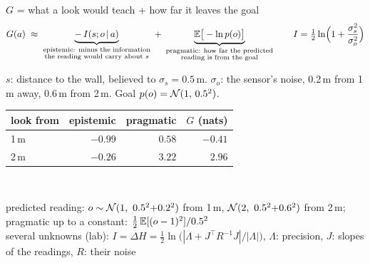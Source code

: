 \documentclass[10pt, aspectratio=169]{beamer}
\begin{document}
\begin{frame}{$G$ = what a look would teach + how far it leaves the goal}
  \centering
  {\small\setlength{\abovedisplayskip}{2pt}\setlength{\belowdisplayskip}{2pt}
  \[
    G(a) \;\approx\; \underbrace{-\,I(s;o\,|\, a)}_{\substack{\text{epistemic: minus the information}\\ \text{the reading would carry about } s}}
    \;+\; \underbrace{\mathbb{E}\big[-\ln p(o)\big]}_{\substack{\text{pragmatic: how far the predicted}\\ \text{reading is from the goal}}}
    \qquad
    I = \tfrac12\ln\!\Big(1+\frac{\sigma_s^2}{\sigma_o^2}\Big)
  \]}
  {\footnotesize $s$: distance to the wall, believed to $\sigma_s = 0.5$\,m.\; $\sigma_o$: the sensor's noise, 0.2\,m from 1\,m away,
  0.6\,m from 2\,m.\; Goal $p(o) = \mathcal{N}(1,\,0.5^2)$.\par}\vspace{0.3em}
  \renewcommand{\arraystretch}{1.1}
  \begin{tabular}{@{}l r r r@{}}
    \toprule
    look from & epistemic & pragmatic & $G$ (nats) \\
    \midrule
    1\,m & $-0.99$ & $0.58$ & \textcolor{good!70!black}{$\mathbf{-0.41}$} \\
    2\,m & $-0.26$ & $3.22$ & $2.96$ \\
    \bottomrule
  \end{tabular}\\[0.4em]
  {\footnotesize predicted reading: $o \sim \N(1,\ 0.5^2{+}0.2^2)$ from 1\,m, $\N(2,\ 0.5^2{+}0.6^2)$ from 2\,m;\; pragmatic up to a constant: $\tfrac12\,\mathbb{E}[(o-1)^2]/0.5^2$\\
   several unknowns (lab): $I = \Delta H = \tfrac12\ln\big(|\Lambda + J^\top R^{-1} J|/|\Lambda|\big)$, $\Lambda$: precision, $J$: slopes of the readings, $R$: their noise\par}
\end{frame}
\end{document}
